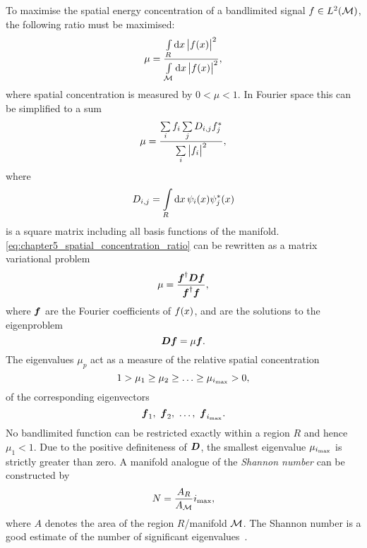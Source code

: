 To maximise the spatial energy concentration of a bandlimited signal \(f \in L^{2}(\mathcal{M})\), the following ratio must be maximised:
%
\begin{equation}
	\mu
	= \frac{\int\limits_{R} \dd{x} \big\lvert f(x)\big\rvert^{2}}{\int\limits_{\mathcal{M}} \dd{x} \big\lvert f(x)\big\rvert^{2}},
\end{equation}
%
where spatial concentration is measured by \(0 < \mu < 1\).
In Fourier space this can be simplified to a sum
%
\begin{equation}\label{eq:chapter5_spatial_concentration_ratio}
	\mu
	= \frac{\sum\limits_{i} f_{i} \sum\limits_{j} D_{i,j} f_{j}^{\ast}}{\sum\limits_{i} \big\lvert f_{i}\big\rvert^{2}},
\end{equation}
%
where
%
\begin{equation}
	D_{i,j}
	= \int\limits_{R} \dd{x} \psi_{i}(x) \psi_{j}^{\ast}(x)
\end{equation}
%
is a square matrix including all basis functions of the manifold.
\cref{eq:chapter5_spatial_concentration_ratio} can be rewritten as a matrix variational problem
%
\begin{equation}
	\mu
	= \frac{\vb*{f}^{\dagger} \vb*{D} \vb*{f}}{\vb*{f}^{\dagger} \vb*{f}},
\end{equation}
%
where \(\vb*{f}\) are the Fourier coefficients of \(f(x)\), and are the solutions to the eigenproblem
%
\begin{equation}\label{eq:chapter5_eigenproblem}
	\vb*{D}\vb*{f}
	= \mu \vb*{f}.
\end{equation}
%
The eigenvalues \(\mu_{p}\) act as a measure of the relative spatial concentration
%
\begin{equation}
	1 > \mu_{1} \geq \mu_{2} \geq \ldots \geq \mu_{\imax} > 0, %
\end{equation}
%
of the corresponding eigenvectors
%
\begin{equation}
	\vb*{f}_{1},\ \vb*{f}_{2},\ \ldots,\ \vb*{f}_{i_{\text{max}}}.
\end{equation}
%
No bandlimited function can be restricted exactly within a region \(R\) and hence \(\mu_{1}<1\).
Due to the positive definiteness of \(\vb*{D}\), the smallest eigenvalue \(\mu_{i_{\text{max}}}\) is strictly greater than zero.
A manifold analogue of the \emph{Shannon number} can be constructed by
%
\begin{equation}\label{eq:chapter5_shannon}
	N
	= \frac{A_{R}}{A_{\mathcal{M}}} i_{\text{max}},
\end{equation}
%
where \(A\) denotes the area of the region \(R\)/manifold \(\mathcal{M}{}\).
The Shannon number is a good estimate of the number of significant eigenvalues~\cite{Percival1993}.

